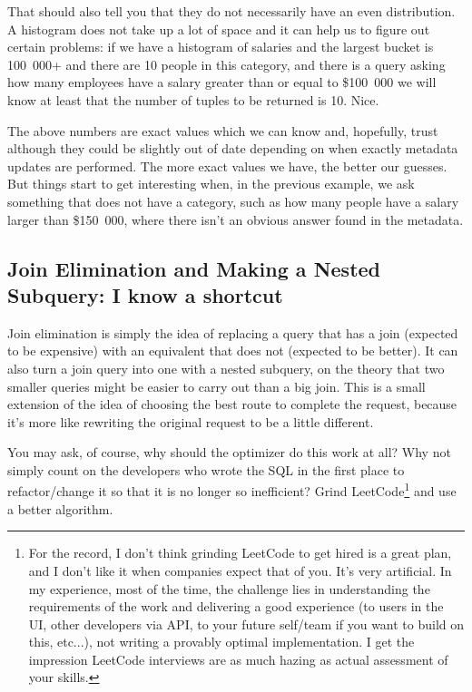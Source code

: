 That should also tell you that they do not necessarily have an even distribution. A histogram does not take up a lot of space and it can help us to figure out certain problems: if we have a histogram of salaries and the largest bucket is 100~000+ and there are 10 people in this category, and there is a query asking how many employees have a salary greater than or equal to \$100~000 we will know at least that the number of tuples to be returned is 10. Nice.

The above numbers are exact values which we can know and, hopefully, trust although they could be slightly out of date depending on when exactly metadata updates are performed. The more exact values we have, the better our guesses. But things start to get interesting when, in the previous example, we ask something that does not have a category, such as how many people have a salary larger than \$150~000, where there isn't an obvious answer found in the metadata.

\subsection*{Join Elimination and Making a Nested Subquery: I know a shortcut}
Join elimination is simply the idea of replacing a query that has a join (expected to be expensive) with an equivalent that does not (expected to be better). It can also turn a join query into one with a nested subquery, on the theory that two smaller queries might be easier to carry out than a big join. This is a small extension of the idea of choosing the best route to complete the request, because it's more like rewriting the original request to be a little different.

You may ask, of course, why should the optimizer do this work at all? Why not simply count on the developers who wrote the SQL in the first place to refactor/change it so that it is no longer so inefficient? Grind LeetCode\footnote{For the record, I don't think grinding LeetCode to get hired is a great plan, and I don't like it when companies expect that of you. It's very artificial. In my experience, most of the time, the challenge lies in understanding the requirements of the work and delivering a good experience (to users in the UI, other developers via API, to your future self/team if you want to build on this, etc...), not writing a provably optimal implementation. I get the impression LeetCode interviews are as much hazing as actual assessment of your skills.} and use a better algorithm.

